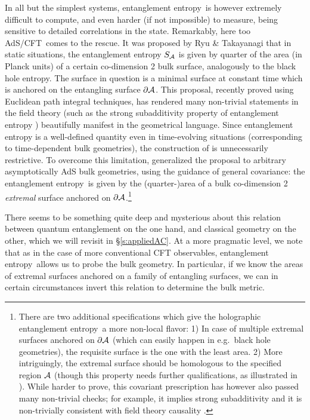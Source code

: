 \documentclass[12pt,a4paper]{article}
\def\sect#1{\S\ref{#1}}
\def\AC{AdS/CFT}
\def\EE{entanglement entropy}
\begin{document}
In all but the simplest systems, \EE\ is however extremely difficult to compute, and even harder (if not impossible) to measure, being sensitive to detailed correlations in the state.  Remarkably, here too \AC\ comes to the rescue.  It was proposed by Ryu \& Takayanagi \cite{Ryu:2006bv}
that in static situations, the entanglement entropy $S_{\cal A}$ is given by quarter of the area (in Planck units) of a certain co-dimension 2 bulk surface, analogously to the black hole entropy.  The surface in question is a minimal surface at constant time which is anchored on the entangling surface $\partial {\cal A}$.  This proposal, recently proved \cite{Lewkowycz:2013nqa} using Euclidean path integral techniques, has 
rendered many non-trivial statements in the field theory (such as the strong subadditivity property of entanglement entropy \cite{Headrick:2007km}) beautifully manifest in the geometrical language.  
Since entanglement entropy is a well-defined quantity even in time-evolving situations (corresponding to time-dependent bulk geometries), the construction of \cite{Ryu:2006bv} is unnecessarily restrictive.  To overcome this limitation, \cite{Hubeny:2007xt} generalized the proposal to arbitrary asymptotically AdS bulk geometries, using the guidance of general covariance: the \EE\ is given by the (quarter-)area of a bulk co-dimension 2 {\it extremal} surface anchored on 
$\partial {\cal A}$.\footnote{
There are two additional specifications which give the holographic \EE\  a more non-local flavor:
1) In case of multiple extremal surfaces anchored on $\partial {\cal A}$ (which can easily happen in e.g.\ black hole geometries), the requisite surface is the one with the least area. 
2) More intriguingly, the extremal surface should be homologous to the specified region ${\cal A}$ (though this property needs further qualifications, as illustrated in \cite{Hubeny:2013gta}).
While harder to prove, this covariant prescription has however also passed many non-trivial checks; for example, it implies strong subadditivity \cite{Wall:2012uf} and it is non-trivially consistent with field theory causality \cite{Headrick:2014cta}. }

There seems to be something quite deep and mysterious about this relation between quantum entanglement on the one hand, and classical geometry on the other, which we will revisit in \sect{s:appliedAC}.  
At a more pragmatic level, we note that
as in the case of more conventional CFT observables, \EE\ allows us to probe the bulk geometry.  In particular, if we know the areas of extremal surfaces anchored on a family of entangling surfaces, we can in certain circumstances invert this relation to determine the bulk metric.
\end{document}
